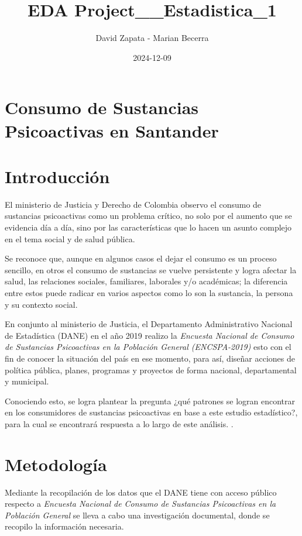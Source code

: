 \documentclass[
]{article}
\title{EDA Project\_\_Estadistica\_1}
\author{David Zapata - Marian Becerra}
\date{2024-12-09}
\begin{document}
\maketitle

\section{Consumo de Sustancias Psicoactivas en
Santander}\label{consumo-de-sustancias-psicoactivas-en-santander}

\section{Introducción}\label{introducciuxf3n}

El ministerio de Justicia y Derecho de Colombia observo el consumo de
sustancias psicoactivas como un problema crítico, no solo por el aumento
que se evidencia día a día, sino por las características que lo hacen un
asunto complejo en el tema social y de salud pública.

Se reconoce que, aunque en algunos casos el dejar el consumo es un
proceso sencillo, en otros el consumo de sustancias se vuelve
persistente y logra afectar la salud, las relaciones sociales,
familiares, laborales y/o académicas; la diferencia entre estos puede
radicar en varios aspectos como lo son la sustancia, la persona y su
contexto social.

En conjunto al ministerio de Justicia, el Departamento Administrativo
Nacional de Estadística (DANE) en el año 2019 realizo la \emph{Encuesta
Nacional de Consumo de Sustancias Psicoactivas en la Población General
(ENCSPA-2019)} esto con el fin de conocer la situación del país en ese
momento, para así, diseñar acciones de política pública, planes,
programas y proyectos de forma nacional, departamental y municipal.

Conociendo esto, se logra plantear la pregunta ¿qué patrones se logran
encontrar en los consumidores de sustancias psicoactivas en base a este
estudio estadístico?, para la cual se encontrará respuesta a lo largo de
este análisis. .\\

\section{Metodología}\label{metodologuxeda}

Mediante la recopilación de los datos que el DANE tiene con acceso
público respecto a \emph{Encuesta Nacional de Consumo de Sustancias
Psicoactivas en la Población General} se lleva a cabo una investigación
documental, donde se recopilo la información necesaria.
\end{document}
